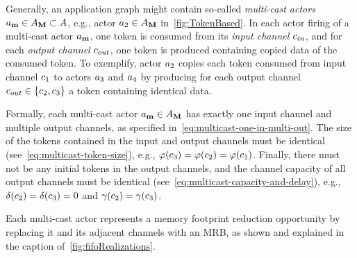 Generally, an application graph might contain so-called \emph{multi-cast actors} $\actorMulticast \in \SetActorsMulticast \subset \SetActors$, e.g., actor $\actor_2 \in \SetActorsMulticast$ in~\cref{fig:TokenBased}.
In each actor firing of a multi-cast actor $\actorMulticast$, one token is consumed from its \emph{input channel} $c_{in}$, and for each \emph{output channel} $c_{out}$, one token is produced containing copied data of the consumed token. %
To exemplify, actor $a_2$ copies each token consumed from input channel $c_1$ to actors $a_3$ and $a_4$ by producing for each output channel $c_{out} \in \{c_2,c_3\}$ a token containing identical data.
\par
Formally, each multi-cast actor $\actorMulticast \in \SetActorsMulticast$ has exactly one input channel and multiple output channels, as specified in~\cref{eq:multicast-one-in-multi-out}.
The size of the tokens contained in the input and output channels must be identical (see~\cref{eq:multicast-token-size}), e.g., $\varphi(c_3) = \varphi(c_2) = \varphi(c_1)$.
Finally, there must not be any initial tokens in the output channels, and the channel capacity of all output channels must be identical (see~\cref{eq:multicast-capacity-and-delay}), e.g., $\delta(c_2) = \delta(c_3) = 0$ and $\gamma(c_2) = \gamma(c_3)$.
\par
Each multi-cast actor represents a memory footprint reduction opportunity by replacing it and its adjacent channels with an \ac{MRB}, as shown and explained in the caption of~\cref{fig:fifoRealizations}.

